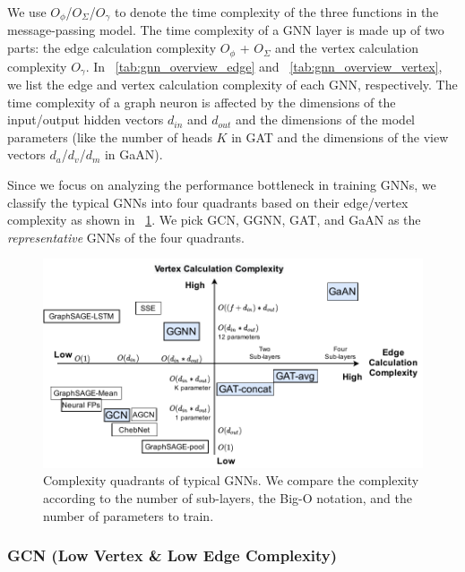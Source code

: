 We use $O_\phi$/$O_\Sigma$/$O_\gamma$ to denote the time complexity of the three functions in the message-passing model.
The time complexity of a GNN layer is made up of two parts: the edge calculation complexity $O_\phi$ + $O_\Sigma$ and the vertex calculation complexity $O_\gamma$.
%
In \tablename~\ref{tab:gnn_overview_edge} and \tablename~\ref{tab:gnn_overview_vertex}, we list the edge and vertex calculation complexity of each GNN, respectively.
The time complexity of a graph neuron is affected by the dimensions of the input/output hidden vectors $d_{in}$ and $d_{out}$ and the dimensions of the model parameters (like the number of heads $K$ in GAT and the dimensions of the view vectors $d_a$/$d_v$/$d_m$ in GaAN).

Since we focus on analyzing the performance bottleneck in training GNNs, we classify the typical GNNs into four quadrants based on their edge/vertex complexity as shown in \figurename~\ref{fig:gnn_complexity_quadrant}. We pick GCN, GGNN, GAT, and GaAN as the \emph{representative} GNNs of the four quadrants.

\begin{figure}[h]
    \centering
    \includegraphics[width=0.8\columnwidth]{figs/illustration/GNN_complexity_quadrant.pdf}
    \caption{Complexity quadrants of typical GNNs. We compare the complexity according to the number of sub-layers, the Big-O notation, and the number of parameters to train.}
    \label{fig:gnn_complexity_quadrant}
\end{figure}

\subsubsection{GCN (Low Vertex \& Low Edge Complexity)}

